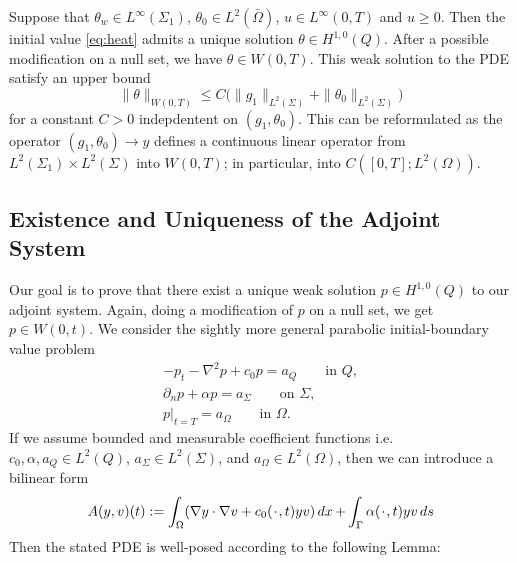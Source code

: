 \begin{corollary}[Existence]
Suppose that $\theta_w \in L^{\infty}(\Sigma_1)$, $\theta_0 \in L^2(\bar{\Omega})$, $u \in L^{\infty}(0,T)$ and $u\geq 0$. Then the initial value \eqref{eq:heat} admits a unique solution $\theta \in H^{1,0}(Q)$. After a possible modification on a null set, we have $\theta \in W(0,T)$. This weak solution to the PDE satisfy an upper bound 
\begin{equation*}
    \|\theta \|_{W(0,T)} \leq C\bigg ( \|g_1\|_{L^2(\Sigma)} + \|\theta_0\|_{L^2(\Sigma)} \bigg )
\end{equation*}
for a constant $C>0$ indepdentent on $(g_1, \theta_0)$. This can be reformulated as the operator $(g_1,\theta_0) \rightarrow y$ defines a continuous linear operator from $L^2(\Sigma_1)\times L^2(\Sigma)$ into $W(0,T)$; in particular, into $C([0,T];L^2(\Omega))$.  
\end{corollary}

\subsection{Existence and Uniqueness of the Adjoint System}
Our goal is to prove that there exist a unique weak solution $p \in H^{1,0}(Q)$ to our adjoint system. Again, doing a modification of $p$ on a null set, we get $p\in W(0,t)$. We consider the sightly more general parabolic initial-boundary value problem 
\begin{align*}
    -p_t -\nabla^2p +c_0p = a_Q \qquad \text{in } Q, \\
    \partial_np + \alpha p = a_{\Sigma} \qquad \text{on } \Sigma, \\
    p|_{t=T} = a_{\Omega} \qquad \text{in } \Omega.
\end{align*}
If we assume bounded and measurable coefficient functions i.e. $c_0, \alpha, a_Q \in L^2(Q)$, $a_{\Sigma} \in L^2(\Sigma)$, and $a_{\Omega} \in L^2(\Omega)$, then we can introduce a bilinear form
\begin{equation}
    \label{eq:parabolic_adj}
    A(y,v)(t) := \int_{\Omega}(\nabla y \cdot \nabla v + c_0(\placeholder,t) y v) \dx + \int_{\Gamma}\alpha(\placeholder,t) y v \ds
\end{equation}
Then the stated PDE is well-posed according to the following Lemma:

